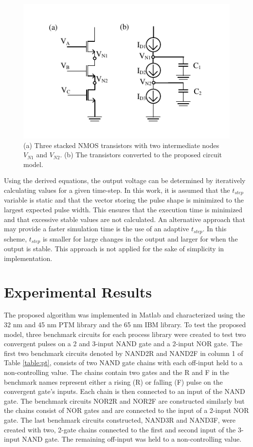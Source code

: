 \begin{figure}[!htbp]
	\centering
	\includegraphics[width=0.70\linewidth]{Figures/Stacked}
	\caption{(a) Three stacked NMOS transistors with two intermediate nodes $V_{N1}$ and $V_{N2}$. (b) The transistors converted to the proposed circuit model.}
	\label{StackT}
\end{figure}

Using the derived equations, the output voltage can be determined by iteratively calculating values for a given time-step. In this work, it is assumed that the $t_{step}$ variable is static and that the vector storing the pulse shape is minimized to the largest expected pulse width. This ensures that the execution time is minimized and that excessive stable values are not calculated. An alternative approach that may provide a faster simulation time is the use of an adaptive $t_{step}$. In this scheme, $t_{step}$ is smaller for large changes in the output and larger for when the output is stable. This approach is not applied for the sake of simplicity in implementation.

\section{Experimental Results}

The proposed algorithm was implemented in Matlab and characterized using the 32 nm and 45 nm PTM library \cite{PTM} and the 65 nm IBM library. To test the proposed model, three benchmark circuits for each process library were created to test two convergent pulses on a 2 and 3-input NAND gate and a 2-input NOR gate. The first two benchmark circuits denoted by NAND2R and NAND2F in column 1 of Table \ref{table:pt}, consists of two NAND gate chains with each off-input held to a non-controlling value. The chains contain two gates and the R and F in the benchmark names represent either a rising (R) or falling (F) pulse on the convergent gate’s inputs. Each chain is then connected to an input of the NAND gate. The benchmark circuits NOR2R and NOR2F are constructed similarly but the chains consist of NOR gates and are connected to the input of a 2-input NOR gate. The last benchmark circuits constructed, NAND3R and NAND3F, were created with two, 2-gate chains connected to the first and second input of the 3-input NAND gate. The remaining off-input was held to a non-controlling value. 

